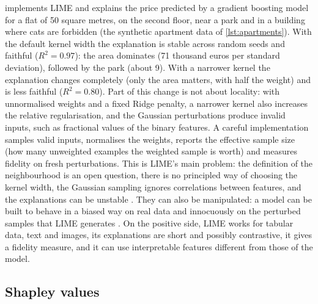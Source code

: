  implements LIME and explains the price predicted by a gradient boosting model for a
flat of 50 square metres, on the second floor, near a park and in a building where cats are forbidden
(the synthetic apartment data of \cref{lst:apartments}). With the default kernel width the
explanation is stable across random seeds and faithful ($R^2=0.97$): the area dominates (71 thousand
euros per standard deviation), followed by the park (about 9). With a narrower kernel the explanation
changes completely (only the area matters, with half the weight) and is less faithful ($R^2=0.80$). Part of this change is not about locality: with unnormalised weights and a
fixed Ridge penalty, a narrower kernel also increases the relative regularisation, and the Gaussian
perturbations produce invalid inputs, such as fractional values of the binary features. A careful
implementation samples valid inputs, normalises the weights, reports the effective sample size (how many unweighted examples the weighted sample is worth) and
measures fidelity on fresh perturbations.
This is LIME's main problem: the definition of the neighbourhood is an open question, there is no
principled way of choosing the kernel width, the Gaussian sampling ignores correlations between
features, and the explanations can be unstable \citep{alvarezmelis2018robustness}. They can also be
manipulated: a model can be built to behave in a biased way on real data and innocuously on the
perturbed samples that LIME generates \citep{slack2020fooling}. On the positive side, LIME works for
tabular data, text and images, its explanations are short and possibly contrastive, it gives a
fidelity measure, and it can use interpretable features different from those of the model.

\subsection{Shapley values}

